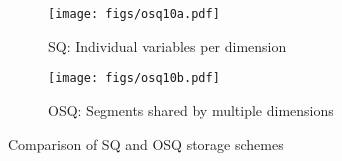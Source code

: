 \begin{figure*}[]
    \centering
    \begin{subfigure}[t]{0.45\textwidth}
        \centering
        \texttt{[image: figs/osq10a.pdf]}
        \caption{SQ: Individual variables per dimension}
        \label{fig:subfig-osq-a}
    \end{subfigure}%
    \begin{subfigure}[t]{0.45\textwidth}
        \centering
        \texttt{[image: figs/osq10b.pdf]}
        \caption{OSQ: Segments shared by multiple dimensions}
        \label{fig:subfig-osq-b}
    \end{subfigure}
    \caption{Comparison of SQ and OSQ storage schemes}
    \label{fig:osq-main}
\end{figure*}